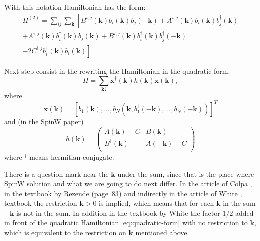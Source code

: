 \documentclass[a4paper,12pt]{article}
\begin{document}
    With this notation Hamiltonian has the form:
    \begin{multline}
        H^{(2)} = \sum_{ij}\sum_{\boldsymbol{k}}\left[\overline{B^{i,j}(\boldsymbol{k})}b_{i}(\boldsymbol{k})b_{j}(-\boldsymbol{k}) +
        \overline{A^{i,j}(\boldsymbol{k})}b_{i}(\boldsymbol{k})b^{\dag}_{j}(\boldsymbol{k})\right. \\+ 
        A^{i,j}(\boldsymbol{k})b^{\dag}_{i}(\boldsymbol{k})b_{j}(\boldsymbol{k}) +
        B^{i,j}(\boldsymbol{k})b^{\dag}_{i}(\boldsymbol{k})b^{\dag}_{j}(-\boldsymbol{k}) \\-
        \left.2 C^{i,j}b^{\dag}_{i}(\boldsymbol{k})b_{i}(\boldsymbol{k})\right] \label{eq:ham-before}
    \end{multline}

    Next step consist in the rewriting the Hamiltonian in the quadratic form:
    \begin{equation}
        H = \sum_{\boldsymbol{k} ?} \boldsymbol{x}^{\dag}(\boldsymbol{k})h(\boldsymbol{k})\boldsymbol{x}(\boldsymbol{k}), \label{eq:quadratic-form}
    \end{equation}
    where
    \begin{equation}
        \boldsymbol{x}(\boldsymbol{k}) = \left[b_1(\boldsymbol{k}), \dots, b_N(\boldsymbol{k}, 
        b^{\dag}_1(-\boldsymbol{k}), \dots, b^{\dag}_N(-\boldsymbol{k}))\right]^T
    \end{equation}
    and (in the SpinW paper)
    \begin{equation}
        h(\boldsymbol{k}) = 
        \begin{pmatrix}
            A(\boldsymbol{k}) - C & B(\boldsymbol{k}) \\
            B^{\dag}(\boldsymbol{k}) &\overline{A(-\boldsymbol{k})} - C \\
        \end{pmatrix}
    \end{equation}
    where $^{\dag}$ means hermitian conjugate.
    
    There is a question mark near the $\boldsymbol{k}$ under the sum, since that is the place where SpinW solution and what we are going to do next differ.
    In the article of Colpa \cite{colpa1978diagonalization}, in the textbook by Rezende \cite{rezende2020fundamentals} (page~$83$) 
    and indirectly in the article of White \cite{white1965diagonalization}, textbook \cite{jensen1991rare} the restriction $\boldsymbol{k} > 0$ is implied, 
    which means that for each $\boldsymbol{k}$ in the sum $-\boldsymbol{k}$ is not in the sum. In addition in the textbook by White \cite{white1983quantum} 
    the factor $1/2$ added in front of the quadratic Hamiltonian \eqref{eq:quadratic-form} with no restriction to $\boldsymbol{k}$, 
    which is equivalent to the restriction on $\boldsymbol{k}$ mentioned above.
\end{document}
